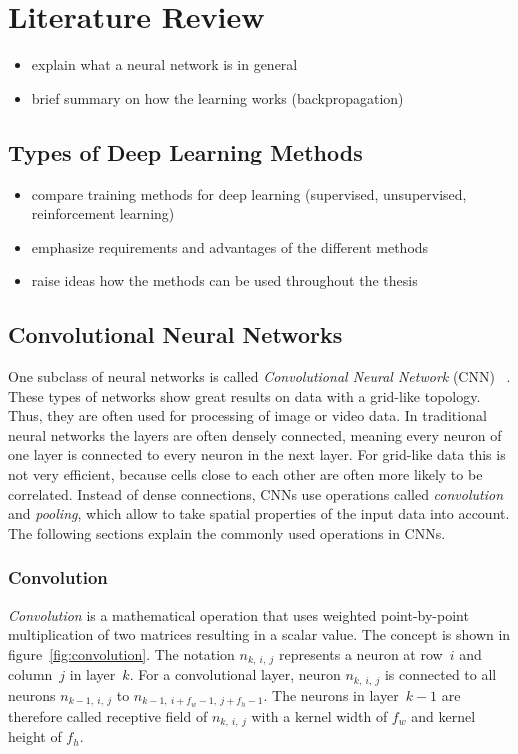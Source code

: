 \section{Literature Review}
\begin{itemize}
    \item explain what a neural network is in general
    \item brief summary on how the learning works (backpropagation)
\end{itemize}

\subsection{Types of Deep Learning Methods}
\begin{itemize}
    \item compare training methods for deep learning (supervised, unsupervised, reinforcement learning)
    \item emphasize requirements and advantages of the different methods
    \item raise ideas how the methods can be used throughout the thesis
\end{itemize}

\subsection{Convolutional Neural Networks}
One subclass of neural networks is called \emph{Convolutional Neural Network} (CNN) ~\cite[p.~359]{praxiseinstieg_ml17}. These types of networks show great results on data with a grid-like topology. Thus, they are often used for processing of image or video data. In traditional neural networks the layers are often densely connected, meaning every neuron of one layer is connected to every neuron in the next layer. For grid-like data this is not very efficient, because cells close to each other are often more likely to be correlated. Instead of dense connections, CNNs use operations called \emph{convolution} and \emph{pooling}, which allow to take spatial properties of the input data into account. The following sections explain the commonly used operations in CNNs.

\subsubsection{Convolution}
\emph{Convolution} is a mathematical operation that uses weighted point-by-point multiplication of two matrices resulting in a scalar value. The concept is shown in figure~\ref{fig:convolution}. The notation $n_{k,~i,~j}$ represents a neuron at row~$i$ and column~$j$ in layer~$k$. For a convolutional layer, neuron $n_{k,~i,~j}$ is connected to all neurons $n_{k-1,~i,~j}$ to $n_{k-1,~i + f_w -1,~j + f_h -1}$. The neurons in layer~$k-1$ are therefore called receptive field of $n_{k,~i,~j}$ with a kernel width of $f_w$ and kernel height of $f_h$.~\cite[p.~361 f]{praxiseinstieg_ml17}

